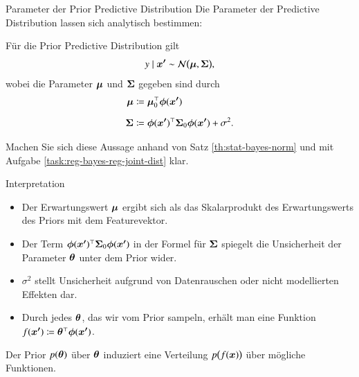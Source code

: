 \begin{frame}{Parameter der Prior Predictive Distribution}{}
	Die Parameter der Predictive Distribution lassen sich analytisch bestimmen:
	
	\begin{mytheo}
		Für die Prior Predictive Distribution gilt
		\begin{equation*}
			y \mid \bm{x'} \sim \mathcal{N}\bigl( \bm{\mu}, \bm{\Sigma} \bigr),
		\end{equation*}
		wobei die Parameter $\bm{\mu}$ und $\bm{\Sigma}$ gegeben sind durch
		\begin{align*}
			\bm{\mu}
				&\coloneqq \bm{\mu}_0^\top \bm{\phi}(\bm{x'})
		\\[2mm]
			\bm{\Sigma}
				&\coloneqq \bm{\phi}(\bm{x'})^\top \bm{\Sigma}_0 \bm{\phi}(\bm{x'}) + \sigma^2.
		\end{align*}
	\end{mytheo}

	\begin{mytask}
		Machen Sie sich diese Aussage anhand von Satz \ref{th:stat-bayes-norm} und mit Aufgabe \ref{task:reg-bayes-reg-joint-dist} klar.
	\end{mytask}
\end{frame}


\begin{frame}{Interpretation}{}
	\begin{itemize}
		\item Der Erwartungswert $\bm{\mu}$ ergibt sich als das Skalarprodukt des Erwartungswerts des Priors mit dem Featurevektor.
		\item Der Term $\bm{\phi}(\bm{x'})^\top \bm{\Sigma}_0 \bm{\phi}(\bm{x'})$ in der Formel für $\bm{\Sigma}$ spiegelt die Unsicherheit der
			Parameter $\bm{\theta}$ unter dem Prior wider.
		\item $\sigma^2$ stellt Unsicherheit aufgrund von Datenrauschen oder nicht modellierten Effekten dar.
		\item Durch jedes $\bm{\theta}$, das wir vom Prior sampeln, erhält man eine Funktion $f(\bm{x'}) \coloneqq \bm{\theta}^\top \bm{\phi}(\bm{x'})$.
	\end{itemize}

	\begin{boxGray}
		Der Prior $p(\bm{\theta})$ über $\bm{\theta}$ induziert eine Verteilung $p\bigl( f(\bm{x}) \bigr)$ über mögliche Funktionen.
	\end{boxGray}
\end{frame}


